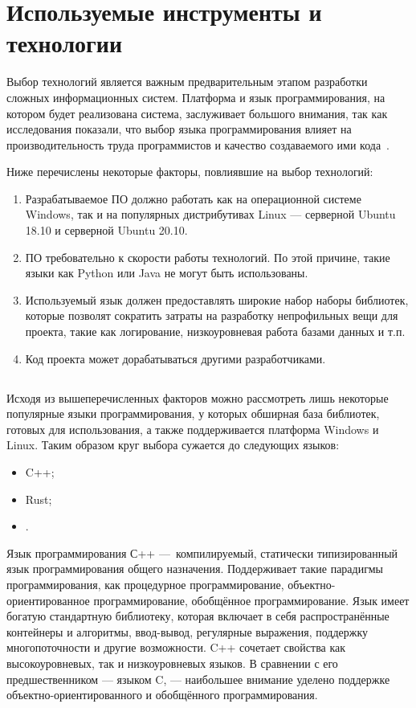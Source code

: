 \section{Используемые инструменты и технологии}\label{sec:tools}

Выбор технологий является важным предварительным этапом разработки сложных информационных систем. Платформа и язык программирования, на котором будет реализована система, заслуживает большого внимания, так как исследования показали, что выбор языка программирования влияет на производительность труда программистов и качество создаваемого ими кода~\cite{code_complete}. %

Ниже перечислены некоторые факторы, повлиявшие на выбор технологий:
\begin{enumerate}
    \item Разрабатываемое ПО должно работать как на операционной системе Windows, так и на популярных дистрибутивах Linux — серверной Ubuntu 18.10 и серверной Ubuntu 20.10.
    \item ПО требовательно к скорости работы технологий. По этой причине, такие языки как Python или Java не могут быть использованы.
    \item Используемый язык должен предоставлять широкие набор наборы библиотек, которые позволят сократить затраты на разработку непрофильных вещи для проекта, такие как логирование, низкоуровневая работа базами данных и т.п.
    \item Код проекта может дорабатываться другими разработчиками.
\end{enumerate}

\subsection{\csharp}

Исходя из вышеперечисленных факторов можно рассмотреть лишь некоторые популярные языки программирования, у которых обширная база библиотек, готовых для использования, а также поддерживается платформа Windows и Linux. Таким образом круг выбора сужается до следующих языков:
\begin{itemize}
    \item C++;
    \item Rust;
    \item \csharp.
\end{itemize}

Язык программирования С++ — компилируемый, статически типизированный язык программирования общего назначения. Поддерживает такие парадигмы программирования, как процедурное программирование, объек\-тно-ориентированное программирование, обобщённое программирование. Язык имеет богатую стандартную библиотеку, которая включает в себя распространённые контейнеры и алгоритмы, ввод-вывод, регулярные выражения, поддержку многопоточности и другие возможности. C++ сочетает свойства как высокоуровневых, так и низкоуровневых языков. В сравнении с его предшественником — языком C, — наибольшее внимание уделено поддержке объектно-ориентированного и обобщённого программирования.

